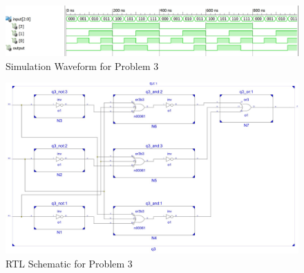 \documentclass{article}
\begin{document}

\begin{figure}[H]
    \centering
    \includegraphics[scale=0.5,cframe=blue 0.5pt 3pt]{3w.jpg}
    \caption{Simulation Waveform for Problem 3}
\end{figure}


\begin{figure}[H]
    \centering
    \includegraphics[scale=0.5,cframe=blue 0.5pt 3pt]{3s.jpg}
    \caption{RTL Schematic for Problem 3}
\end{figure}



\end{document}
